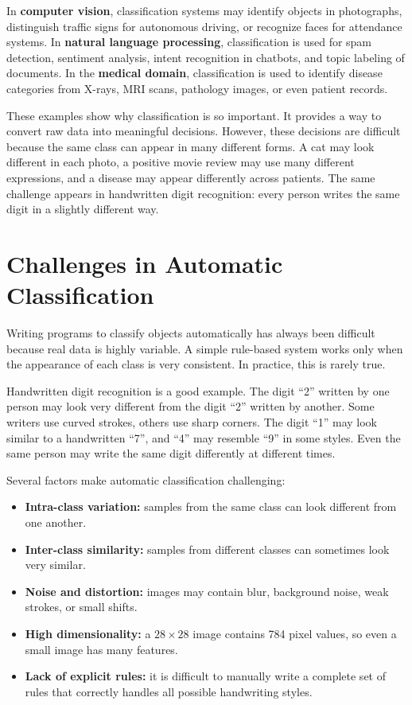 \documentclass[11pt]{article}
\begin{document}
In \textbf{computer vision}, classification systems may identify objects in photographs, distinguish traffic signs for autonomous driving, or recognize faces for attendance systems. In \textbf{natural language processing}, classification is used for spam detection, sentiment analysis, intent recognition in chatbots, and topic labeling of documents. In the \textbf{medical domain}, classification is used to identify disease categories from X-rays, MRI scans, pathology images, or even patient records.

These examples show why classification is so important. It provides a way to convert raw data into meaningful decisions. However, these decisions are difficult because the same class can appear in many different forms. A cat may look different in each photo, a positive movie review may use many different expressions, and a disease may appear differently across patients. The same challenge appears in handwritten digit recognition: every person writes the same digit in a slightly different way.

\section{Challenges in Automatic Classification}

Writing programs to classify objects automatically has always been difficult because real data is highly variable. A simple rule-based system works only when the appearance of each class is very consistent. In practice, this is rarely true.

Handwritten digit recognition is a good example. The digit ``2'' written by one person may look very different from the digit ``2'' written by another. Some writers use curved strokes, others use sharp corners. The digit ``1'' may look similar to a handwritten ``7'', and ``4'' may resemble ``9'' in some styles. Even the same person may write the same digit differently at different times.

Several factors make automatic classification challenging:
\begin{itemize}
    \item \textbf{Intra-class variation:} samples from the same class can look different from one another.
    \item \textbf{Inter-class similarity:} samples from different classes can sometimes look very similar.
    \item \textbf{Noise and distortion:} images may contain blur, background noise, weak strokes, or small shifts.
    \item \textbf{High dimensionality:} a $28 \times 28$ image contains 784 pixel values, so even a small image has many features.
    \item \textbf{Lack of explicit rules:} it is difficult to manually write a complete set of rules that correctly handles all possible handwriting styles.
\end{itemize}
\end{document}

